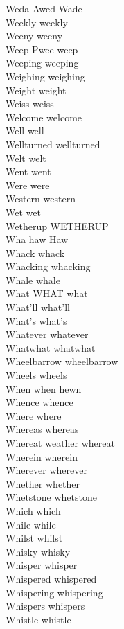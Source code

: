 Weda Awed Wade\\
Weekly weekly\\
Weeny weeny\\
Weep Pwee weep\\
Weeping weeping\\
Weighing weighing\\
Weight weight\\
Weiss weiss\\
Welcome welcome\\
Well well\\
Wellturned wellturned\\
Welt welt\\
Went went\\
Were were\\
Western western\\
Wet wet\\
Wetherup WETHERUP\\
Wha haw Haw\\
Whack whack\\
Whacking whacking\\
Whale whale\\
What WHAT what\\
What'll what'll\\
What's what's\\
Whatever whatever\\
Whatwhat whatwhat\\
Wheelbarrow wheelbarrow\\
Wheels wheels\\
When when hewn\\
Whence whence\\
Where where\\
Whereas whereas\\
Whereat weather whereat\\
Wherein wherein\\
Wherever wherever\\
Whether whether\\
Whetstone whetstone\\
Which which\\
While while\\
Whilst whilst\\
Whisky whisky\\
Whisper whisper\\
Whispered whispered\\
Whispering whispering\\
Whispers whispers\\
Whistle whistle\\
